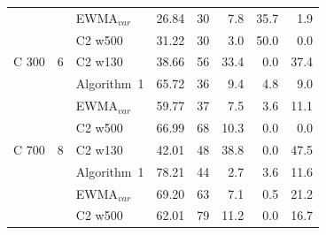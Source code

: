 \begin{tabular}{lclrrrrr}
 &  & EWMA$_{var}$ & 26.84 & 30 & 7.8 & 35.7 & 1.9 \\
 &  & C2 w500 & 31.22 & 30 & 3.0 & 50.0 & 0.0 \\
\hline
C  300 & 6 & C2 w130 & 38.66 & 56 & 33.4 & 0.0 & 37.4 \\
 &  & Algorithm~1 & 65.72 & 36 & 9.4 & 4.8 & 9.0 \\
 &  & EWMA$_{var}$ & 59.77 & 37 & 7.5 & 3.6 & 11.1 \\
 &  & C2 w500 & 66.99 & 68 & 10.3 & 0.0 & 0.0 \\
\hline
C  700 & 8 & C2 w130 & 42.01 & 48 & 38.8 & 0.0 & 47.5 \\
 &  & Algorithm~1 & 78.21 & 44 & 2.7 & 3.6 & 11.6 \\
 &  & EWMA$_{var}$ & 69.20 & 63 & 7.1 & 0.5 & 21.2 \\
 &  & C2 w500 & 62.01 & 79 & 11.2 & 0.0 & 16.7 \\
\hline
\end{tabular}
